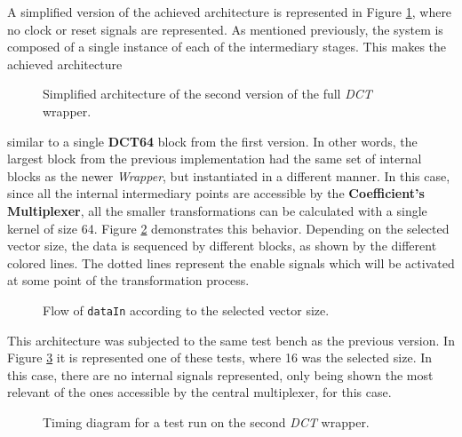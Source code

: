 A simplified version of the achieved architecture is represented in Figure \ref{fig:fullv2}, where no clock or reset signals are represented. As mentioned previously, the system is composed of a single instance of each of the intermediary stages. This makes the achieved architecture

\begin{landscape}
    \vspace*{\fill}
    \begin{figure}[!htbp]
        \centering
        
        \caption{Simplified architecture of the second version of the full \emph{DCT} wrapper.}
        \label{fig:fullv2}
    \end{figure}
    \vspace*{\fill}        
\end{landscape}

\noindent
similar to a single \textbf{DCT64} block from the first version. In other words, the largest block from the previous implementation had the same set of internal blocks as the newer \emph{Wrapper}, but instantiated in a different manner. In this case, since all the internal intermediary points are accessible by the \textbf{Coefficient's Multiplexer}, all the smaller transformations can be calculated with a single kernel of size 64. Figure \ref{fig:v2datapath} demonstrates this behavior. Depending on the selected vector size, the data is sequenced by different blocks, as shown by the different colored lines. The dotted lines represent the enable signals which will be activated at some point of the transformation process.

\begin{figure}[!htbp]
    \centering
    
    \caption{Flow of \texttt{dataIn} according to the selected vector size.}
    \label{fig:v2datapath}
\end{figure}

This architecture was subjected to the same test bench as the previous version. In Figure \ref{fig:v2timing} it is represented one of these tests, where 16 was the selected size. In this case, there are no internal signals represented, only being shown the most relevant of the ones accessible by the central multiplexer, for this case. 

\begin{figure}[!htbp]
    \centering
    
    \caption{Timing diagram for a test run on the second \emph{DCT} wrapper.}
    \label{fig:v2timing}
\end{figure}

